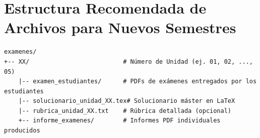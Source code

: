 \documentclass[12pt,letterpaper]{article}
\begin{document}
\section{Estructura Recomendada de Archivos para Nuevos Semestres}

\begin{verbatim}
examenes/
+-- XX/                          # Número de Unidad (ej. 01, 02, ..., 05)
    |-- examen_estudiantes/      # PDFs de exámenes entregados por los estudiantes
    |-- solucionario_unidad_XX.tex# Solucionario máster en LaTeX
    |-- rubrica_unidad_XX.txt    # Rúbrica detallada (opcional)
    +-- informe_examenes/        # Informes PDF individuales producidos
\end{verbatim}
\end{document}
